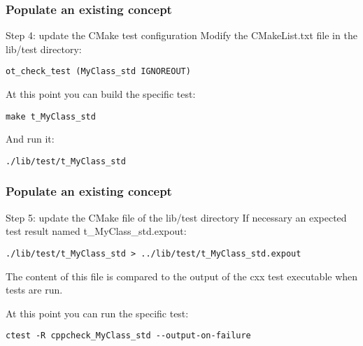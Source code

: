 \documentclass[8pt]{beamer}
\begin{document}
\begin{frame}[fragile]
  \frametitle{Populate an existing concept}
  \begin{block}{Step 4: update the CMake test configuration}
    Modify the CMakeList.txt file in the lib/test directory:\\
\begin{lstlisting}
ot_check_test (MyClass_std IGNOREOUT)
\end{lstlisting}
    At this point you can build the specific test:\\
\begin{lstlisting}
make t_MyClass_std
\end{lstlisting}
     And run it:\\
\begin{lstlisting}
./lib/test/t_MyClass_std
\end{lstlisting}
  \end{block}
  
\end{frame}
\begin{frame}[fragile]
  \frametitle{Populate an existing concept}
  \begin{block}{Step 5: update the CMake file of the lib/test directory}
    If necessary an expected test result named t\_MyClass\_std.expout:\\
\begin{lstlisting}
./lib/test/t_MyClass_std > ../lib/test/t_MyClass_std.expout
\end{lstlisting}

    The content of this file is compared to the output of the cxx test executable when tests are run.

    At this point you can run the specific test:\\
\begin{lstlisting}
ctest -R cppcheck_MyClass_std --output-on-failure
\end{lstlisting}
  \end{block}
\end{frame}
\end{document}
